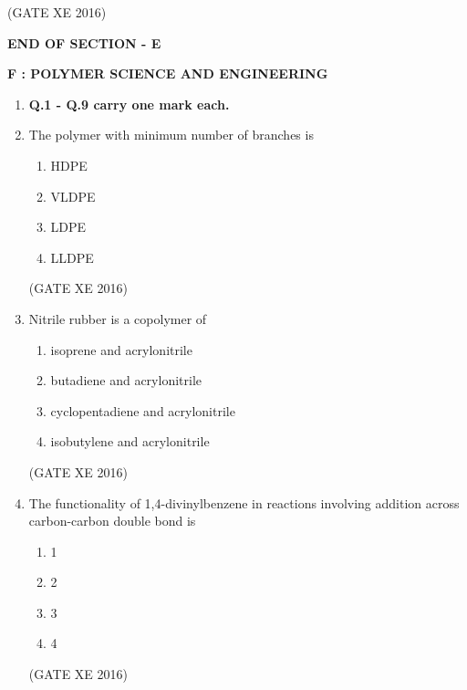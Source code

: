 \documentclass[12pt]{article}
\begin{document}
\begin{enumerate}
(GATE XE 2016)


\end{enumerate}

\begin{center}
    \textbf{END OF SECTION - E}
\end{center}

\newpage

\begin{center}
    {\Large \textbf{F : POLYMER SCIENCE AND ENGINEERING}}
\end{center}

\begin{enumerate}

\item[] \textbf{Q.1 - Q.9 carry one mark each.}

\item The polymer with minimum number of branches is
\begin{multicols}{2}
\begin{enumerate}
\item HDPE 
\item VLDPE 
\item LDPE 
\item LLDPE 
\end{enumerate}
\end{multicols}
(GATE XE 2016)

\item Nitrile rubber is a copolymer of
\begin{multicols}{2}
\begin{enumerate}
\item isoprene and acrylonitrile 
\item butadiene and acrylonitrile 
\item cyclopentadiene and acrylonitrile 
\item isobutylene and acrylonitrile 
\end{enumerate}
\end{multicols}
(GATE XE 2016)

\item The functionality of 1,4-divinylbenzene in reactions involving addition across carbon-carbon double bond is
\begin{multicols}{4}
\begin{enumerate}
\item 1 
\item 2 
\item 3 
\item 4 
\end{enumerate}
\end{multicols}
(GATE XE 2016)


\end{enumerate}
\end{document}
